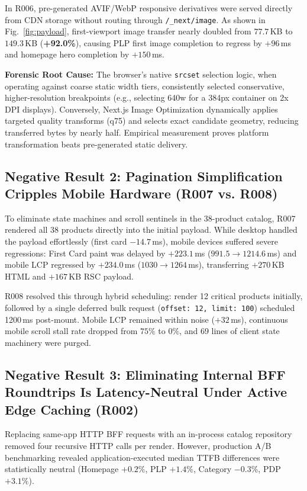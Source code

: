 \documentclass[conference]{IEEEtran}
\begin{document}
In R006, pre-generated AVIF/WebP responsive derivatives were served directly from CDN storage without routing through \texttt{/\_next/image}. As shown in Fig.~\ref{fig:payload}, first-viewport image transfer nearly doubled from $77.7$\,KB to $149.3$\,KB (\textbf{+92.0\%}), causing PLP first image completion to regress by $+96$\,ms and homepage hero completion by $+150$\,ms.

\textbf{Forensic Root Cause:} The browser's native \texttt{srcset} selection logic, when operating against coarse static width tiers, consistently selected conservative, higher-resolution breakpoints (e.g., selecting 640w for a 384px container on 2x DPI displays). Conversely, Next.js Image Optimization dynamically applies targeted quality transforms (q75) and selects exact candidate geometry, reducing transferred bytes by nearly half. Empirical measurement proves platform transformation beats pre-generated static delivery.

\subsection{Negative Result 2: Pagination Simplification Cripples Mobile Hardware (R007 vs. R008)}
To eliminate state machines and scroll sentinels in the 38-product catalog, R007 rendered all 38 products directly into the initial payload. While desktop handled the payload effortlessly (first card $-14.7$\,ms), mobile devices suffered severe regressions: First Card paint was delayed by $+223.1$\,ms ($991.5 \to 1214.6$\,ms) and mobile LCP regressed by $+234.0$\,ms ($1030 \to 1264$\,ms), transferring $+270$\,KB HTML and $+167$\,KB RSC payload.

R008 resolved this through hybrid scheduling: render 12 critical products initially, followed by a single deferred bulk request (\texttt{offset: 12, limit: 100}) scheduled 1200\,ms post-mount. Mobile LCP remained within noise ($+32$\,ms), continuous mobile scroll stall rate dropped from $75\%$ to $0\%$, and 69 lines of client state machinery were purged.

\subsection{Negative Result 3: Eliminating Internal BFF Roundtrips Is Latency-Neutral Under Active Edge Caching (R002)}
Replacing same-app HTTP BFF requests with an in-process catalog repository removed four recursive HTTP calls per render. However, production A/B benchmarking revealed application-executed median TTFB differences were statistically neutral (Homepage $+0.2\%$, PLP $+1.4\%$, Category $-0.3\%$, PDP $+3.1\%$).
\end{document}
